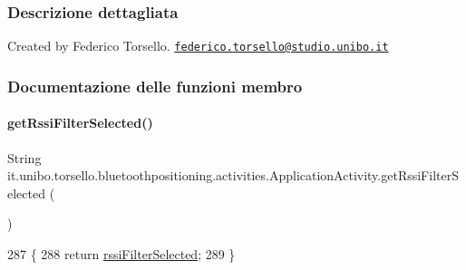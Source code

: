 \subsubsection{Descrizione dettagliata}
Created by Federico Torsello. \href{mailto:federico.torsello@studio.unibo.it}{\tt federico.\+torsello@studio.\+unibo.\+it} 

\subsubsection{Documentazione delle funzioni membro}
\hypertarget{classit_1_1unibo_1_1torsello_1_1bluetoothpositioning_1_1activities_1_1ApplicationActivity_a54fb622e186f1a1e4af2b84b7466c560_a54fb622e186f1a1e4af2b84b7466c560}{}\label{classit_1_1unibo_1_1torsello_1_1bluetoothpositioning_1_1activities_1_1ApplicationActivity_a54fb622e186f1a1e4af2b84b7466c560_a54fb622e186f1a1e4af2b84b7466c560} 
\paragraph{\texorpdfstring{get\+Rssi\+Filter\+Selected()}{getRssiFilterSelected()}}
{\footnotesize\ttfamily String it.\+unibo.\+torsello.\+bluetoothpositioning.\+activities.\+Application\+Activity.\+get\+Rssi\+Filter\+Selected (\begin{DoxyParamCaption}{ }\end{DoxyParamCaption})}


\begin{DoxyCode}
287                                           \{
288         \textcolor{keywordflow}{return} \hyperlink{classit_1_1unibo_1_1torsello_1_1bluetoothpositioning_1_1activities_1_1ApplicationActivity_aa0775c805f735289a7fc6c380ff81fca_aa0775c805f735289a7fc6c380ff81fca}{rssiFilterSelected};
289     \}
\end{DoxyCode}
\hypertarget{classit_1_1unibo_1_1torsello_1_1bluetoothpositioning_1_1activities_1_1ApplicationActivity_a55d4f45ce163b9f613420686f6dfe1cf_a55d4f45ce163b9f613420686f6dfe1cf}{}\label{classit_1_1unibo_1_1torsello_1_1bluetoothpositioning_1_1activities_1_1ApplicationActivity_a55d4f45ce163b9f613420686f6dfe1cf_a55d4f45ce163b9f613420686f6dfe1cf} 
